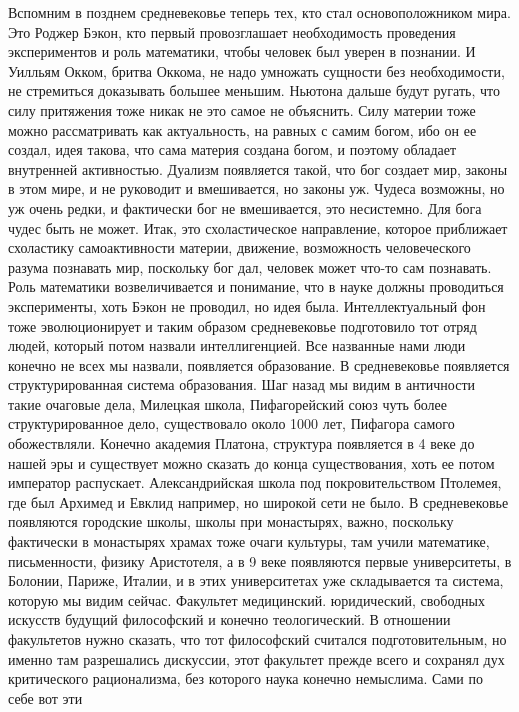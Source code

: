 \documentclass[a4paper, 12pt]{article}
\begin{document}
Вспомним в позднем средневековье теперь тех, кто стал основоположником 
мира. Это Роджер Бэкон, кто первый провозглашает необходимость 
проведения экспериментов и роль математики, чтобы человек был уверен 
в познании. И Уилльям Окком, бритва Оккома, не надо умножать сущности 
без необходимости, не стремиться доказывать большее меньшим. Ньютона 
дальше будут ругать, что силу притяжения тоже никак не это самое не 
объяснить. Силу материи тоже можно рассматривать как актуальность, на 
равных с самим богом, ибо он ее создал, идея такова, что сама материя 
создана богом, и поэтому обладает внутренней активностью. Дуализм 
появляется такой, что бог создает мир, законы в этом мире, и не руководит 
и вмешивается, но законы уж. Чудеса возможны, но уж очень редки, 
и фактически бог не вмешивается, это несистемно. Для бога чудес быть не 
может. Итак, это схоластическое направление, которое приближает 
схоластику самоактивности материи, движение, возможность человеческого 
разума познавать мир, поскольку бог дал, человек может что-то сам 
познавать. Роль математики возвеличивается и понимание, что в науке 
должны проводиться эксперименты, хоть Бэкон не проводил, но идея была. 
Интеллектуальный фон тоже эволюционирует и таким образом средневековье 
подготовило тот отряд людей, который потом назвали интеллигенцией. Все 
названные нами люди конечно не всех мы назвали, появляется образование. 
В средневековье появляется структурированная система образования. Шаг 
назад мы видим в античности такие очаговые дела, Милецкая школа, 
Пифагорейский союз чуть более структурированное дело, существовало около 
1000 лет, Пифагора самого обожествляли. Конечно академия Платона, 
структура появляется в 4 веке до нашей эры и существует можно сказать 
до конца существования, хоть ее потом император распускает. 
Александрийская школа под покровительством Птолемея, где был Архимед 
и Евклид например, но широкой сети не было. В средневековье появляются 
городские школы, школы при монастырях, важно, поскольку фактически 
в монастырях храмах тоже очаги культуры, там учили математике, 
письменности, физику Аристотеля, а в 9 веке появляются первые 
университеты, в Болонии, Париже, Италии, и в этих университетах уже 
складывается та система, которую мы видим сейчас. Факультет медицинский. 
юридический, свободных искусств будущий философский и конечно 
теологический. В отношении факультетов нужно сказать, что тот 
философский считался подготовительным, но именно там разрешались 
дискуссии, этот факультет прежде всего и сохранял дух критического 
рационализма, без которого наука конечно немыслима. Сами по себе вот эти 
\end{document}
